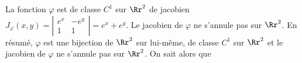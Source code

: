 {{La fonction $\varphi$ est de classe $C^1$ sur $\Rr^2$ de jacobien $J_\varphi(x,y)=\left|
\begin{array}{cc}
e^x&-e^y\\
1&1
\end{array}
\right|=e^x+e^y$. Le jacobien de $\varphi$ ne s'annule pas sur $\Rr^2$. En résumé, $\varphi$ est une bijection de $\Rr^2$ sur lui-même, de classe $C^1$ sur $\Rr^2$ et le jacobien de $\varphi$ ne s'annule pas sur $\Rr^2$. On sait alors que

\begin{center}
\end{center}
}
}
